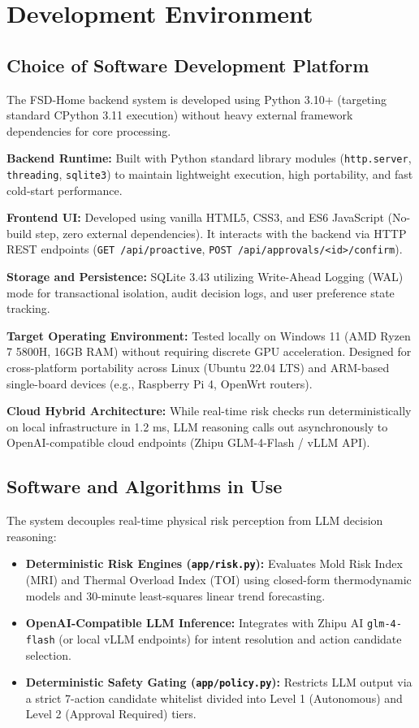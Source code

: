 \documentclass[conference]{IEEEtran}
\begin{document}
\section{Development Environment}

\subsection{Choice of Software Development Platform}
The FSD-Home backend system is developed using Python 3.10+ (targeting standard CPython 3.11 execution) without heavy external framework dependencies for core processing.

\textbf{Backend Runtime:} Built with Python standard library modules (\texttt{http.server}, \texttt{threading}, \texttt{sqlite3}) to maintain lightweight execution, high portability, and fast cold-start performance.

\textbf{Frontend UI:} Developed using vanilla HTML5, CSS3, and ES6 JavaScript (No-build step, zero external dependencies). It interacts with the backend via HTTP REST endpoints (\texttt{GET /api/proactive}, \texttt{POST /api/approvals/<id>/confirm}).

\textbf{Storage and Persistence:} SQLite 3.43 utilizing Write-Ahead Logging (WAL) mode for transactional isolation, audit decision logs, and user preference state tracking.

\textbf{Target Operating Environment:} Tested locally on Windows 11 (AMD Ryzen 7 5800H, 16GB RAM) without requiring discrete GPU acceleration. Designed for cross-platform portability across Linux (Ubuntu 22.04 LTS) and ARM-based single-board devices (e.g., Raspberry Pi 4, OpenWrt routers).

\textbf{Cloud Hybrid Architecture:} While real-time risk checks run deterministically on local infrastructure in 1.2 ms, LLM reasoning calls out asynchronously to OpenAI-compatible cloud endpoints (Zhipu GLM-4-Flash / vLLM API).

\subsection{Software and Algorithms in Use}
The system decouples real-time physical risk perception from LLM decision reasoning:
\begin{itemize}
    \item \textbf{Deterministic Risk Engines (\texttt{app/risk.py}):} Evaluates Mold Risk Index (MRI) and Thermal Overload Index (TOI) using closed-form thermodynamic models and 30-minute least-squares linear trend forecasting.
    \item \textbf{OpenAI-Compatible LLM Inference:} Integrates with Zhipu AI \texttt{glm-4-flash} (or local vLLM endpoints) for intent resolution and action candidate selection.
    \item \textbf{Deterministic Safety Gating (\texttt{app/policy.py}):} Restricts LLM output via a strict 7-action candidate whitelist divided into Level 1 (Autonomous) and Level 2 (Approval Required) tiers.
\end{itemize}
\end{document}

